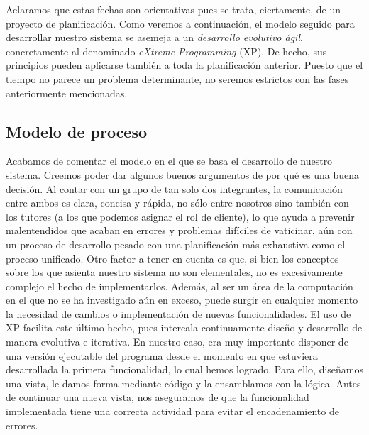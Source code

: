 Aclaramos que estas fechas son orientativas pues se trata, ciertamente, de un proyecto de planificación. Como veremos a continuación, el  modelo seguido para desarrollar nuestro sistema se asemeja a un \textit{desarrollo evolutivo ágil}, concretamente al denominado {\textit{eXtreme Programming}} (XP). De hecho, sus principios pueden aplicarse también a toda la planificación anterior. Puesto que el tiempo no parece un problema determinante, no seremos estrictos con las fases anteriormente mencionadas.

\subsection{Modelo de proceso}

Acabamos de comentar el modelo en el que se basa el  desarrollo de nuestro sistema. Creemos poder dar algunos buenos argumentos de por qué es una buena decisión. Al contar con un grupo de tan solo dos integrantes, la comunicación entre ambos es clara, concisa y rápida, no sólo entre nosotros sino también con los tutores (a los que podemos asignar el rol de cliente), lo que ayuda a prevenir malentendidos que acaban en errores y problemas difíciles de vaticinar, aún con un proceso de desarrollo pesado con una planificación más exhaustiva como el proceso unificado.
%
Otro factor a tener en cuenta es que, si bien los conceptos sobre los que asienta nuestro sistema no son elementales, no es excesivamente complejo el hecho de implementarlos. Además, al ser un área de la computación en el que no se ha investigado aún en exceso, puede surgir en cualquier momento la necesidad de cambios o implementación de nuevas funcionalidades.
%
El uso de XP facilita este último hecho, pues intercala continuamente diseño y desarrollo de manera evolutiva e iterativa. En nuestro caso, era muy importante disponer de una versión ejecutable del programa desde el momento en que estuviera desarrollada la primera funcionalidad, lo cual hemos logrado. Para ello, diseñamos una vista, le damos forma mediante código y la ensamblamos con la lógica. Antes de continuar una nueva vista, nos aseguramos de que la funcionalidad implementada tiene una correcta actividad para evitar el encadenamiento de errores.

